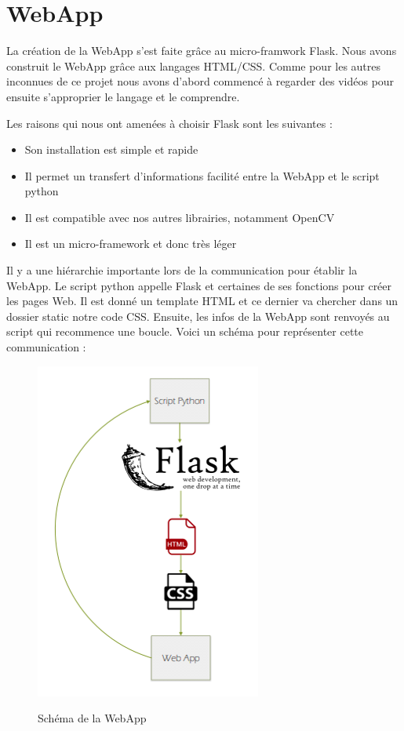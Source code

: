 \documentclass[
	a4paper,									%
	11pt,										%
	twoside,									%
	openright,									%
	notitlepage,									%
	parskip=half,								%
]{scrreprt}										%
\begin{document}
\section{WebApp}

La création de la WebApp s'est faite grâce au micro-framwork Flask. Nous avons construit le WebApp grâce aux langages 
HTML/CSS. Comme pour les autres inconnues de ce projet nous avons d'abord commencé à regarder des vidéos pour ensuite
s'approprier le langage et le comprendre. \par

Les raisons qui nous ont amenées à choisir Flask sont les suivantes : 

\begin{itemize}
	\item Son installation est simple et rapide 
	\item Il permet un transfert d'informations facilité entre la WebApp et le script python
	\item Il est compatible avec nos autres librairies, notamment OpenCV
	\item Il est un micro-framework et donc très léger
\end{itemize}

Il y a une hiérarchie importante lors de la communication pour établir la WebApp. Le script python appelle Flask et certaines 
de ses fonctions pour créer les pages Web. Il est donné un template HTML et ce dernier va chercher dans un dossier static 
notre code CSS. Ensuite, les infos de la WebApp sont renvoyés au script qui recommence une boucle. 
Voici un schéma pour représenter cette communication : 

\begin{figure}[!h]
	\centering
	\includegraphics[scale=.8]{img/Schema_WebApp.png}
	\label{WebApp}
	\caption{Schéma de la WebApp}
\end{figure}
\end{document}
